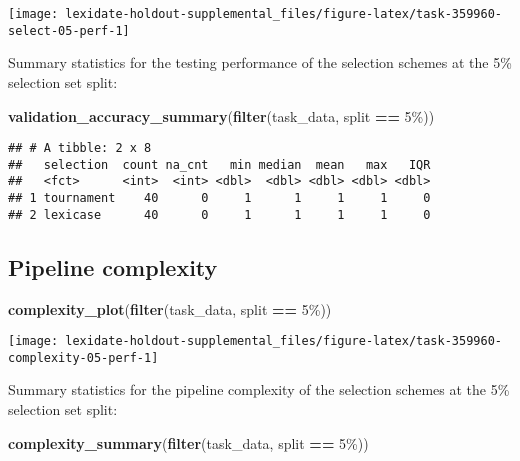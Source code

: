 \documentclass[
]{book}
\newenvironment{Shaded}{\begin{snugshade}}{\end{snugshade}}
\newcommand{\FunctionTok}[1]{\textcolor[rgb]{0.13,0.29,0.53}{\textbf{#1}}}
\newcommand{\NormalTok}[1]{#1}
\newcommand{\SpecialCharTok}[1]{\textcolor[rgb]{0.81,0.36,0.00}{\textbf{#1}}}
\newcommand{\StringTok}[1]{\textcolor[rgb]{0.31,0.60,0.02}{#1}}
\begin{document}
\texttt{[image: lexidate-holdout-supplemental\_files/figure-latex/task-359960-select-05-perf-1]}

Summary statistics for the testing performance of the selection schemes at the 5\% selection set split:

\begin{Shaded}
\begin{Highlighting}[]
\FunctionTok{validation\_accuracy\_summary}\NormalTok{(}\FunctionTok{filter}\NormalTok{(task\_data, split }\SpecialCharTok{==} \StringTok{\textquotesingle{}5\%\textquotesingle{}}\NormalTok{))}
\end{Highlighting}
\end{Shaded}

\begin{verbatim}
## # A tibble: 2 x 8
##   selection  count na_cnt   min median  mean   max   IQR
##   <fct>      <int>  <int> <dbl>  <dbl> <dbl> <dbl> <dbl>
## 1 tournament    40      0     1      1     1     1     0
## 2 lexicase      40      0     1      1     1     1     0
\end{verbatim}

\hypertarget{pipeline-complexity-43}{%
\subsection{Pipeline complexity}\label{pipeline-complexity-43}}

\begin{Shaded}
\begin{Highlighting}[]
\FunctionTok{complexity\_plot}\NormalTok{(}\FunctionTok{filter}\NormalTok{(task\_data, split }\SpecialCharTok{==} \StringTok{\textquotesingle{}5\%\textquotesingle{}}\NormalTok{))}
\end{Highlighting}
\end{Shaded}

\texttt{[image: lexidate-holdout-supplemental\_files/figure-latex/task-359960-complexity-05-perf-1]}

Summary statistics for the pipeline complexity of the selection schemes at the 5\% selection set split:

\begin{Shaded}
\begin{Highlighting}[]
\FunctionTok{complexity\_summary}\NormalTok{(}\FunctionTok{filter}\NormalTok{(task\_data, split }\SpecialCharTok{==} \StringTok{\textquotesingle{}5\%\textquotesingle{}}\NormalTok{))}
\end{Highlighting}
\end{Shaded}
\end{document}

